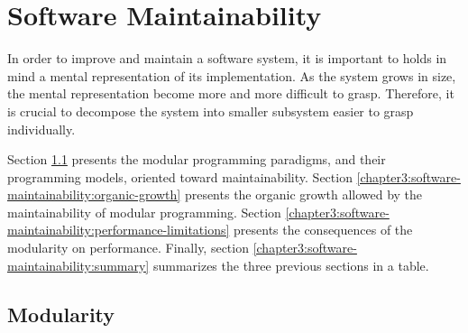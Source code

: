 \section{Software Maintainability} \label{chapter3:software-maintainability}


In order to improve and maintain a software system, it is important to holds in mind a mental representation of its implementation.
As the system grows in size, the mental representation become more and more difficult to grasp.
Therefore, it is crucial to decompose the system into smaller subsystem easier to grasp individually.


Section \ref{chapter3:software-maintainability:modularity} presents the modular programming paradigms, and their programming models, oriented toward maintainability.
Section \ref{chapter3:software-maintainability:organic-growth} presents the organic growth allowed by the maintainability of modular programming.
Section \ref{chapter3:software-maintainability:performance-limitations} presents the consequences of the modularity on performance.
Finally, section \ref{chapter3:software-maintainability:summary} summarizes the three previous sections in a table.

\subsection{Modularity} \label{chapter3:software-maintainability:modularity}

